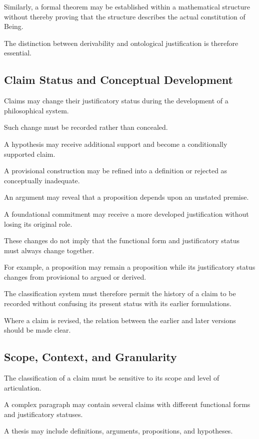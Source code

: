 Similarly,
a formal
theorem may
be established
within a
mathematical
structure without
thereby proving
that the
structure describes
the actual
constitution
of Being.

The distinction
between derivability
and ontological
justification
is therefore
essential.

\subsection{Claim Status and Conceptual Development}

Claims may
change their
justificatory
status during
the development
of a philosophical
system.

Such change
must be
recorded rather
than concealed.

A hypothesis
may receive
additional
support and
become a
conditionally
supported claim.

A provisional
construction
may be
refined into
a definition
or rejected
as conceptually
inadequate.

An argument
may reveal
that a proposition
depends upon
an unstated
premise.

A foundational
commitment
may receive
a more
developed
justification
without losing
its original
role.

These changes
do not imply
that the
functional form
and justificatory
status must
always change
together.

For example,
a proposition
may remain
a proposition
while its
justificatory
status changes
from provisional
to argued
or derived.

The classification
system must
therefore permit
the history
of a claim
to be recorded
without confusing
its present
status with
its earlier
formulations.

Where a
claim is
revised, the
relation between
the earlier
and later
versions should
be made
clear.

\subsection{Scope, Context, and Granularity}

The classification
of a claim
must be
sensitive to
its scope
and level
of articulation.

A complex
paragraph may
contain several
claims with
different functional
forms and
justificatory
statuses.

A thesis
may include
definitions,
arguments,
propositions,
and hypotheses.

